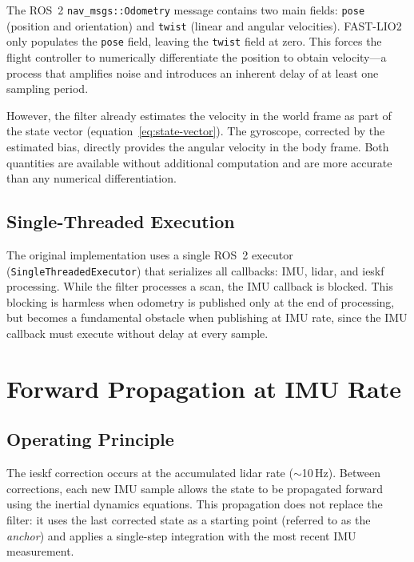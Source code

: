 The ROS~2 \texttt{nav\_msgs::Odometry} message contains two main fields:
\texttt{pose} (position and orientation) and \texttt{twist} (linear and angular
velocities). FAST-LIO2 only populates the \texttt{pose} field, leaving the
\texttt{twist} field at zero. This forces the flight controller to numerically
differentiate the position to obtain velocity---a process that amplifies noise and
introduces an inherent delay of at least one sampling period.

However, the filter already estimates the velocity in the world frame as part of
the state vector (equation~\ref{eq:state-vector}). The gyroscope, corrected by the
estimated bias, directly provides the angular velocity in the body frame. Both
quantities are available without additional computation and are more accurate than
any numerical differentiation.

\subsection{Single-Threaded Execution}
\label{sec:fr-single-thread}

The original implementation uses a single ROS~2 executor
(\texttt{SingleThreadedExecutor}) that serializes all callbacks: IMU, \gls{lidar},
and \gls{ieskf} processing. While the filter processes a scan, the IMU callback is
blocked. This blocking is harmless when odometry is published only at the end of
processing, but becomes a fundamental obstacle when publishing at IMU rate, since
the IMU callback must execute without delay at every sample.

\section{Forward Propagation at IMU Rate}
\label{sec:fr-forward-prop}

\subsection{Operating Principle}
\label{sec:fr-principle}

The \gls{ieskf} correction occurs at the accumulated \gls{lidar} rate
($\sim$10\,Hz). Between corrections, each new IMU sample allows the state to be
propagated forward using the inertial dynamics equations. This propagation does not
replace the filter: it uses the last corrected state as a starting point (referred
to as the \emph{anchor}) and applies a single-step integration with the most recent
IMU measurement.

